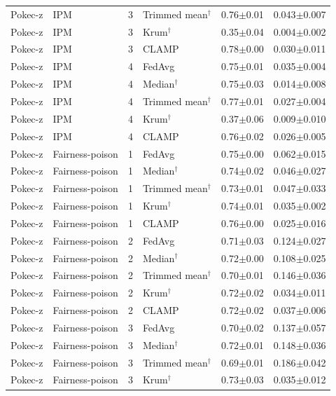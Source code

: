 \begin{longtable}{llclcc}
Pokec-z & IPM & 3 & Trimmed mean$^\dagger$ & 0.76$\pm$0.01 & 0.043$\pm$0.007 \\
Pokec-z & IPM & 3 & Krum$^\dagger$ & 0.35$\pm$0.04 & 0.004$\pm$0.002 \\
Pokec-z & IPM & 3 & CLAMP & 0.78$\pm$0.00 & 0.030$\pm$0.011 \\
Pokec-z & IPM & 4 & FedAvg & 0.75$\pm$0.01 & 0.035$\pm$0.004 \\
Pokec-z & IPM & 4 & Median$^\dagger$ & 0.75$\pm$0.03 & 0.014$\pm$0.008 \\
Pokec-z & IPM & 4 & Trimmed mean$^\dagger$ & 0.77$\pm$0.01 & 0.027$\pm$0.004 \\
Pokec-z & IPM & 4 & Krum$^\dagger$ & 0.37$\pm$0.06 & 0.009$\pm$0.010 \\
Pokec-z & IPM & 4 & CLAMP & 0.76$\pm$0.02 & 0.026$\pm$0.005 \\
Pokec-z & Fairness-poison & 1 & FedAvg & 0.75$\pm$0.00 & 0.062$\pm$0.015 \\
Pokec-z & Fairness-poison & 1 & Median$^\dagger$ & 0.74$\pm$0.02 & 0.046$\pm$0.027 \\
Pokec-z & Fairness-poison & 1 & Trimmed mean$^\dagger$ & 0.73$\pm$0.01 & 0.047$\pm$0.033 \\
Pokec-z & Fairness-poison & 1 & Krum$^\dagger$ & 0.74$\pm$0.01 & 0.035$\pm$0.002 \\
Pokec-z & Fairness-poison & 1 & CLAMP & 0.76$\pm$0.00 & 0.025$\pm$0.016 \\
Pokec-z & Fairness-poison & 2 & FedAvg & 0.71$\pm$0.03 & 0.124$\pm$0.027 \\
Pokec-z & Fairness-poison & 2 & Median$^\dagger$ & 0.72$\pm$0.00 & 0.108$\pm$0.025 \\
Pokec-z & Fairness-poison & 2 & Trimmed mean$^\dagger$ & 0.70$\pm$0.01 & 0.146$\pm$0.036 \\
Pokec-z & Fairness-poison & 2 & Krum$^\dagger$ & 0.72$\pm$0.02 & 0.034$\pm$0.011 \\
Pokec-z & Fairness-poison & 2 & CLAMP & 0.72$\pm$0.02 & 0.037$\pm$0.006 \\
Pokec-z & Fairness-poison & 3 & FedAvg & 0.70$\pm$0.02 & 0.137$\pm$0.057 \\
Pokec-z & Fairness-poison & 3 & Median$^\dagger$ & 0.72$\pm$0.01 & 0.148$\pm$0.036 \\
Pokec-z & Fairness-poison & 3 & Trimmed mean$^\dagger$ & 0.69$\pm$0.01 & 0.186$\pm$0.042 \\
Pokec-z & Fairness-poison & 3 & Krum$^\dagger$ & 0.73$\pm$0.03 & 0.035$\pm$0.012 \\

\end{longtable}
